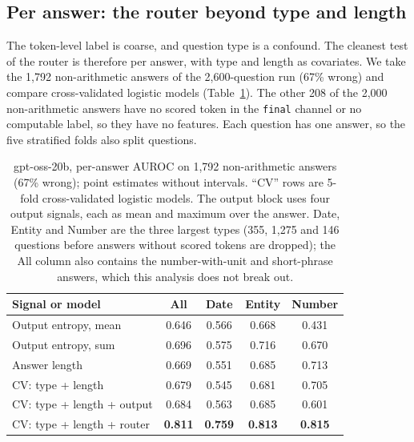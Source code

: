 \documentclass[11pt]{article}
\begin{document}
\subsection{Per answer: the router beyond type and length}
\label{sec:response}

The token-level label is coarse, and question type is a confound.
The cleanest test of the router is therefore per answer, with type and length as covariates.
We take the 1,792 non-arithmetic answers of the 2,600-question run (67\% wrong) and compare cross-validated logistic models (Table~\ref{tab:response}).
The other 208 of the 2,000 non-arithmetic answers have no scored token in the \texttt{final} channel or no computable label, so they have no features.
Each question has one answer, so the five stratified folds also split questions.

\begin{table}[t]
\centering
\small
\caption{gpt-oss-20b, per-answer AUROC on 1,792 non-arithmetic answers (67\% wrong); point estimates without intervals. ``CV'' rows are 5-fold cross-validated logistic models. The output block uses four output signals, each as mean and maximum over the answer. Date, Entity and Number are the three largest types (355, 1,275 and 146 questions before answers without scored tokens are dropped); the All column also contains the number-with-unit and short-phrase answers, which this analysis does not break out.}
\label{tab:response}
\begin{tabular}{lcccc}
\toprule
Signal or model & All & Date & Entity & Number \\
\midrule
Output entropy, mean & 0.646 & 0.566 & 0.668 & 0.431 \\
Output entropy, sum & 0.696 & 0.575 & 0.716 & 0.670 \\
Answer length & 0.669 & 0.551 & 0.685 & 0.713 \\
CV: type + length & 0.679 & 0.545 & 0.681 & 0.705 \\
CV: type + length + output & 0.684 & 0.563 & 0.685 & 0.601 \\
CV: type + length + router & \textbf{0.811} & \textbf{0.759} & \textbf{0.813} & \textbf{0.815} \\
\bottomrule
\end{tabular}
\end{table}
\end{document}

